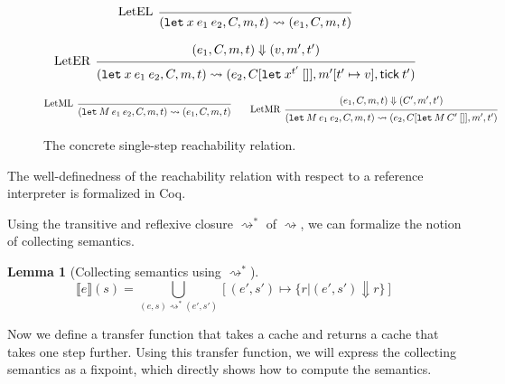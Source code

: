 \documentclass[acmsmall,screen,review]{acmart}
\theoremstyle{definition}
\newtheorem{lem}{Lemma}[section]
\newcommand*{\mem}{m}
\newcommand*{\sembracket}[1]{\lBrack{#1}\rBrack}
\newcommand*{\tick}{\mathsf{tick}}
\begin{document}
\begin{figure}[htb]
  \[
    \begin{prooftree}
      \infer[left label=LetEL]0{
      (\mathtt{let}\:x\:e_1\:e_2, C, \mem, t)
      \rightsquigarrow
      (e_{1}, C, \mem, t)
      }
    \end{prooftree}
  \]

  \[
    \begin{prooftree}
      \hypo{
        \begin{matrix}
          (e_{1}, C, \mem, t)
          \Downarrow
          (v, \mem', t')
        \end{matrix}
      }
      \infer[left label=LetER]1{
      (\mathtt{let}\:x\:e_1\:e_2, C, \mem, t)
      \rightsquigarrow
      (e_{2}, C[\mathtt{let}\:x^{t'}\:[]], \mem'[t'\mapsto v], \tick\:t')
      }
    \end{prooftree}
  \]

  \[
    \begin{prooftree}
      \infer[left label=LetML]0{
      (\mathtt{let}\:M\:e_{1}\:e_{2}, C, \mem, t)
      \rightsquigarrow
      (e_{1}, C, \mem, t)
      }
    \end{prooftree}\qquad
    \begin{prooftree}
      \hypo{
        \begin{matrix}
          (e_{1}, C, \mem, t)
          \Downarrow
          (C', \mem', t')
        \end{matrix}
      }
      \infer[left label=LetMR]1{
      (\mathtt{let}\:M\:e_{1}\:e_{2}, C, \mem, t)
      \rightsquigarrow
      (e_{2}, C[\mathtt{let}\:M\:C'\:[]], \mem', t')
      }
    \end{prooftree}
  \]
  \caption{The concrete single-step reachability relation.}
  \label{fig:concreach}
\end{figure}
The well-definedness of the reachability relation with respect to a reference interpreter is formalized in Coq.

Using the transitive and reflexive closure $\rightsquigarrow^{*}$ of $\rightsquigarrow$, we can formalize the notion of collecting semantics.

\begin{lem}[Collecting semantics using $\rightsquigarrow^{*}$]
  \[
    \sembracket{e}(s)=\bigcup_{(e,s)\rightsquigarrow^{*}(e',s')}[(e',s')\mapsto\{r|(e',s')\Downarrow r\}]
  \]
\end{lem}

Now we define a transfer function that takes a cache and returns a cache that takes one step further.
Using this transfer function, we will express the collecting semantics as a fixpoint, which directly shows how to compute the semantics.
\end{document}
